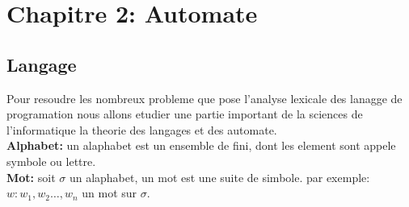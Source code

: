 \documentclass[a4paper,11pt]{article}
\begin{document}
  \section{\color{OrangeHaf}Chapitre 2: Automate}
  \subsection{Langage}
  Pour resoudre les nombreux probleme que pose l'analyse lexicale des lanagge de programation nous allons etudier une partie 
  important de la sciences de l'informatique la theorie des langages et des automate.\\
      \textbf{Alphabet:}
        un alaphabet est un ensemble de fini, dont les element sont appele symbole ou lettre.
        \\
      \textbf{Mot:}
        soit $\sigma$ un alaphabet, un mot est une suite de simbole. par exemple: $w:w_1,w_2\ldots,w_n$ un mot sur $\sigma$.\\

        
\end{document}
